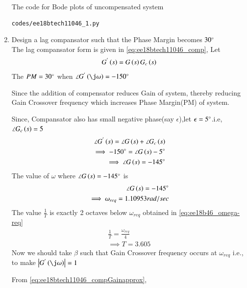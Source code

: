 \begin{enumerate}[label=\thesection.\arabic*.,ref=\thesection.\theenumi]
The code for Bode plots of uncompensated system 
\begin{lstlisting}
codes/ee18btech11046_1.py
\end{lstlisting}
% 



\item Design a lag compansator such that the Phase Margin becomes $30\degree$ \\
\solution
The lag compansator form is given in  \eqref{eq:ee18btech11046_comp},
Let
\begin{align}
G^{'}\left(s\right)=G\left(s\right)G_{c}\left(s\right)
\end{align}
The $PM = 30\degree$ when $\angle G^{'}\brak{\j\omega} = -150\degree$ 

Since the addition of compensator reduces Gain of system, thereby reducing Gain Crossover frequency which increases Phase Margin(PM) of system.

Since, Compansator also has small negative phase(say $\epsilon$),let $\epsilon =5\degree$.i.e, $\angle G_{c}\left(s\right) = 5$ 
\begin{align}
\angle G^{'}\left(s\right) = \angle G\left(s\right) + \angle G_{c}\left(s\right)
\\
\implies
-150\degree = \angle G\left(s\right) - 5\degree
\\
\implies
\angle G\left(s\right) = -145\degree
\end{align}
The value of $\omega$ where $\angle G\left(s\right) = -145\degree$ is 
\begin{align}
\angle G\left(s\right) = -145\degree
\\
\implies
\omega_{req} = 1.10953rad/sec
\label{eq:ee18b46_omega-req}
\end{align}
The value $\frac{1}{T}$ is exactly 2 octaves below $\omega_{req}$ obtained in \eqref{eq:ee18b46_omega-req}
\begin{align}
\frac{1}{T} = \frac{\omega_{req}}{4}
\\
\implies
T = 3.605
\label{eq:ee18btech11046_T}
\end{align}
Now we should take $\beta$ such that Gain Crossover frequency occurs at $\omega_{req}$ i.e., to make $\abs{G^{'}\brak{\j\omega}} = 1$

From \eqref{eq:ee18btech11046_compGainapprox},


\end{enumerate}
